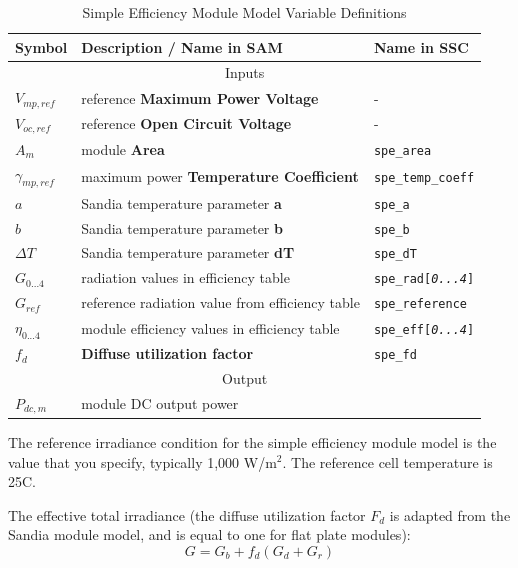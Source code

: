 \documentclass[12pt,letterpaper]{article}
\begin{document}
\begin{table}
\begin{center}
\caption{Simple Efficiency Module Model Variable Definitions}
\begin{tabular}{lll}
\midrule
Symbol & Description / \textbf{Name in SAM} & Name in SSC \\
\midrule
\multicolumn{3}{c}{Inputs}\\
$V_{mp,ref}$ & reference \textbf{Maximum Power Voltage} & - \\
$V_{oc,ref}$ & reference \textbf{Open Circuit Voltage} & - \\
$A_m$ & module \textbf{Area} & \texttt{spe\_area} \\
$\gamma_{mp,ref}$ & maximum power \textbf{Temperature Coefficient} & \texttt{spe\_temp\_coeff} \\
$a$ & Sandia temperature parameter \textbf{a} & \texttt{spe\_a} \\
$b$ & Sandia temperature parameter \textbf{b} & \texttt{spe\_b} \\
$\Delta T$ & Sandia temperature parameter \textbf{dT} & \texttt{spe\_dT} \\
$G_{0...4}$ & radiation values in efficiency table & \texttt{spe\_rad[\textit{0...4}]} \\
$G_{ref}$ & reference radiation value from efficiency table & \texttt{spe\_reference} \\
$\eta_{0...4}$ & module efficiency values in efficiency table & \texttt{spe\_eff[\textit{0...4}]} \\
$f_d$ & \textbf{Diffuse utilization factor} & \texttt{spe\_fd} \\
\midrule
\multicolumn{3}{c}{Output}\\
$P_{dc,m}$ & module DC output power & \\
\hline
\end{tabular}
\label{tab-spemodulevars}
\end{center}
\end{table}

The reference irradiance condition for the simple efficiency module model is the value that you specify, typically 1,000 W/m$^2$. The reference cell temperature is 25\degree C. 

The effective total irradiance (the diffuse utilization factor $F_d$ is adapted from the Sandia module model, and is equal to one for flat plate modules):
\begin{equation}
G = G_b + f_d(G_d+G_r)
\end{equation}
\end{document}
